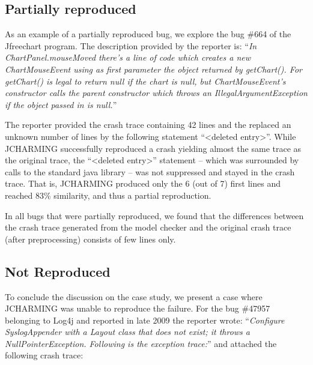\documentclass[times]{smrauth}
\begin{document}
\subsection{Partially reproduced}

As an example of a partially reproduced bug, we explore the
bug \#664 of the Jfreechart program. The description provided
by the reporter is: ``{\it In ChartPanel.mouseMoved there's a line
of code which creates a new ChartMouseEvent using as first
parameter the object returned by getChart(). For getChart() is
legal to return null if the chart is null, but ChartMouseEvent's
constructor calls the parent constructor which throws an
IllegalArgumentException if the object passed in is null.}''

The reporter provided the crash trace containing 42 lines and
the replaced an unknown number of lines by the following
statement ``<deleted entry>''. While JCHARMING successfully reproduced a crash yielding almost the same trace
as the original trace, the ``<deleted entry>'' statement -- which
was surrounded by calls to the standard java library -- was not
suppressed and stayed in the crash trace. That is,
JCHARMING produced only the 6 (out of 7) first lines and
reached 83\% similarity, and thus a partial reproduction.

\noindent{}

In all bugs that were partially reproduced, we found that the
differences between the crash trace generated from the model
checker and the original crash trace (after preprocessing)
consists of few lines only.

\subsection{Not Reproduced}

To conclude the discussion on the case study, we present a
case where JCHARMING was unable to reproduce the failure.
For the bug \#47957 belonging to Log4j and reported in late
2009 the reporter wrote: ``{\it Configure SyslogAppender with a Layout class that does not
exist; it throws a NullPointerException. Following is the
exception trace:}'' and attached the following crash trace:
\end{document}
